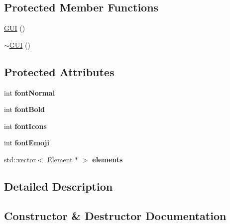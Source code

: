 \subsection*{Protected Member Functions}
\begin{DoxyCompactItemize}
\item 
\hyperlink{class_g_u_i_a8cbb3140b7d3c9d8e942d6ce6b60a0e8}{G\+UI} ()
\item 
\hyperlink{class_g_u_i_ac9cae2328dcb5d83bdfaeca49a2eb695}{$\sim$\+G\+UI} ()
\end{DoxyCompactItemize}
\subsection*{Protected Attributes}
\begin{DoxyCompactItemize}
\item 
\mbox{\label{class_g_u_i_a8238cc4e645adc02f33292aadbac0dbc}} 
int {\bfseries font\+Normal}
\item 
\mbox{\label{class_g_u_i_aff3771878b641e7dbd5617354cfaaa06}} 
int {\bfseries font\+Bold}
\item 
\mbox{\label{class_g_u_i_a2b9c88ac79b448f9105167205aca19f5}} 
int {\bfseries font\+Icons}
\item 
\mbox{\label{class_g_u_i_a298b31a655a8e7f42b276b578c8c1088}} 
int {\bfseries font\+Emoji}
\item 
\mbox{\label{class_g_u_i_aa20ff127be875642c85beb430b194c01}} 
std\+::vector$<$ \hyperlink{class_element}{Element} $\ast$ $>$ {\bfseries elements}
\end{DoxyCompactItemize}


\subsection{Detailed Description}


\subsection{Constructor \& Destructor Documentation}
\mbox{\label{class_g_u_i_a8cbb3140b7d3c9d8e942d6ce6b60a0e8}} 
